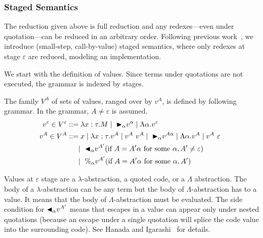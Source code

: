 
\subsubsection{Staged Semantics}

The reduction given above is full reduction and any redexes---even
under quotation---can be reduced in an arbitrary order.  Following
previous work~\cite{}, we introduce (small-step, call-by-value) staged
semantics, where only redexes at stage $\varepsilon$ are reduced, modeling an
implementation.

We start with the definition of values.  Since terms under quotations are
not executed, the grammar is indexed by stages.

\begin{definition}[Values]
	The family $V^A$ of sets of values, ranged over by $v^A$,
	is defined by following grammar.  In the grammar, $A \neq \varepsilon$ is assumed.
	\begin{align*}
		v^\varepsilon \in V^\varepsilon & ::= \lambda x:\tau.M \mid\ {\mathop{\blacktriangleright}}_\alpha v^\alpha \mid \Lambda\alpha.v^\varepsilon                                       & \\
		v^A \in V^A                     & ::= x \mid \lambda x:\tau.v^A \mid v^A\ v^A \mid\ {\mathop{\blacktriangleright}}_\alpha v^{A\alpha} \mid \Lambda\alpha.v^A \mid v^A\ \varepsilon & \\
		                                & \quad\   \mid\ {\mathop{\blacktriangleleft}}_\alpha v^{A'} (\text{if } A = A'\alpha \text{ for some } \alpha, A' \neq \varepsilon)             & \\
		                                & \quad\   \mid\ \%_\alpha v^{A'} (\text{if } A = A'\alpha  \text{ for some } \alpha, A')
	\end{align*}
\end{definition}

Values at $\varepsilon$ stage are a $\lambda$-abstraction, a quoted code,
or a $\Lambda$ abstraction.  The body of a $\lambda$-abstraction can
be any term but the body of $\Lambda$-abstraction has to a value.  It
means that the body of $\Lambda$-abstraction must be evaluated.  The
side condition for ${\mathop{\blacktriangleleft}}_\alpha v^{A'}$ means that escapes in a value
can appear only under nested quotations (because an escape under a
single quotation will splice the code value into the surrounding
code).  See Hanada and Igarashi~\cite{} for details.

